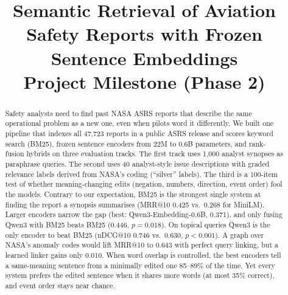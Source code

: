 \documentclass[conference]{IEEEtran}
\begin{document}
\title{Semantic Retrieval of Aviation Safety Reports with Frozen Sentence Embeddings\\
\large Project Milestone (Phase 2)}

\author{
}

\maketitle

\begin{abstract}
Safety analysts need to find past NASA ASRS reports that describe the same operational
problem as a new one, even when pilots word it differently. We built one pipeline that
indexes all 47,723 reports in a public ASRS release and scores keyword search (BM25),
frozen sentence encoders from 22M to 0.6B parameters, and rank-fusion hybrids on three
evaluation tracks. The first track uses 1,000 analyst synopses as paraphrase
queries. The second uses 40 analyst-style issue descriptions with graded relevance labels
derived from NASA's coding (``silver'' labels). The third is a 100-item test of whether
meaning-changing edits (negation, numbers, direction, event order) fool the models.
Contrary to our expectation, BM25 is the strongest single system at finding the report a
synopsis summarises (MRR@10 0.425 vs.\ 0.268 for MiniLM). Larger encoders narrow the gap
(best: Qwen3-Embedding-0.6B, 0.371), and only fusing Qwen3 with BM25 beats BM25 (0.446,
$p{=}0.018$). On topical queries Qwen3 is the only encoder to beat BM25 (nDCG@10 0.746 vs.\
0.630, $p<0.001$). A graph over NASA's anomaly codes would lift MRR@10 to 0.643 with
perfect query linking, but a learned linker gains only 0.010. When word
overlap is controlled, the best encoders tell a same-meaning sentence from a minimally
edited one 85--89\% of the time. Yet every system prefers the edited sentence when it
shares more words (at most 35\% correct), and event order stays near chance.
\end{abstract}
\end{document}

